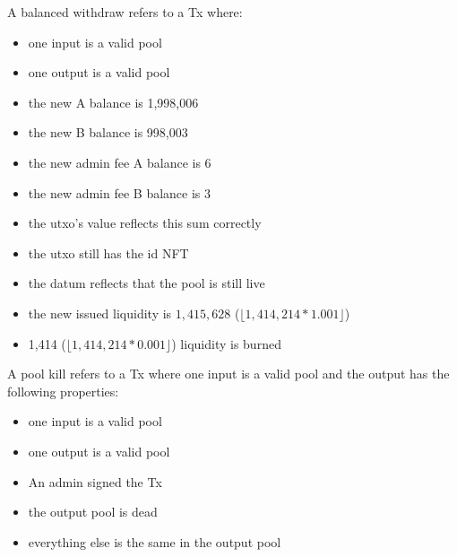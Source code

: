 \documentclass{article}
\begin{document}
A balanced withdraw refers to a Tx where:
\begin{itemize}
	\item one input is a valid pool
	\item one output is a valid pool
	\item the new A balance is 1,998,006
	\item the new B balance is 998,003
	\item the new admin fee A balance is 6
	\item the new admin fee B balance is 3
	\item the utxo's value reflects this sum correctly
	\item the utxo still has the id NFT
	\item the datum reflects that the pool is still live
	\item the new issued liquidity is $1,415,628$ ($\lfloor 1,414,214*1.001 \rfloor$)
	\item 1,414 ($\lfloor 1,414,214*0.001 \rfloor$) liquidity is burned
\end{itemize}

A pool kill refers to a Tx where one input is a valid pool
and the output has the following properties:
\begin{itemize}
	\item one input is a valid pool
	\item one output is a valid pool
	\item An admin signed the Tx
	\item the output pool is dead
	\item everything else is the same in the output pool
\end{itemize}
\end{document}
